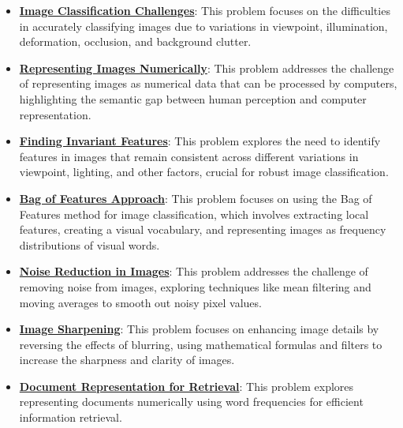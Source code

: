 \documentclass{article}%
\begin{document}
\begin{itemize}[leftmargin=*]%
\item \href{https://www.math.purdue.edu/~yipn/351/07L2-Vision.pdf#page=4}{\textbf{Image Classification Challenges}}: This problem focuses on the difficulties in accurately classifying images due to variations in viewpoint, illumination, deformation, occlusion, and background clutter.%
\item \href{https://www.math.purdue.edu/~yipn/351/07L2-Vision.pdf#page=4}{\textbf{Representing Images Numerically}}: This problem addresses the challenge of representing images as numerical data that can be processed by computers, highlighting the semantic gap between human perception and computer representation.%
\item \href{https://www.math.purdue.edu/~yipn/351/07L2-Vision.pdf#page=11}{\textbf{Finding Invariant Features}}: This problem explores the need to identify features in images that remain consistent across different variations in viewpoint, lighting, and other factors, crucial for robust image classification.%
\item \href{https://www.math.purdue.edu/~yipn/351/07L2-Vision.pdf#page=12}{\textbf{Bag of Features Approach}}: This problem focuses on using the Bag of Features method for image classification, which involves extracting local features, creating a visual vocabulary, and representing images as frequency distributions of visual words.%
\item \href{https://www.math.purdue.edu/~yipn/351/07L2-Vision.pdf#page=35}{\textbf{Noise Reduction in Images}}: This problem addresses the challenge of removing noise from images, exploring techniques like mean filtering and moving averages to smooth out noisy pixel values.%
\item \href{https://www.math.purdue.edu/~yipn/351/07L2-Vision.pdf#page=52}{\textbf{Image Sharpening}}: This problem focuses on enhancing image details by reversing the effects of blurring, using mathematical formulas and filters to increase the sharpness and clarity of images.%
\item \href{https://www.math.purdue.edu/~yipn/351/07L2-Vision.pdf#page=20}{\textbf{Document Representation for Retrieval}}: This problem explores representing documents numerically using word frequencies for efficient information retrieval.%
\end{itemize}%
\end{document}
